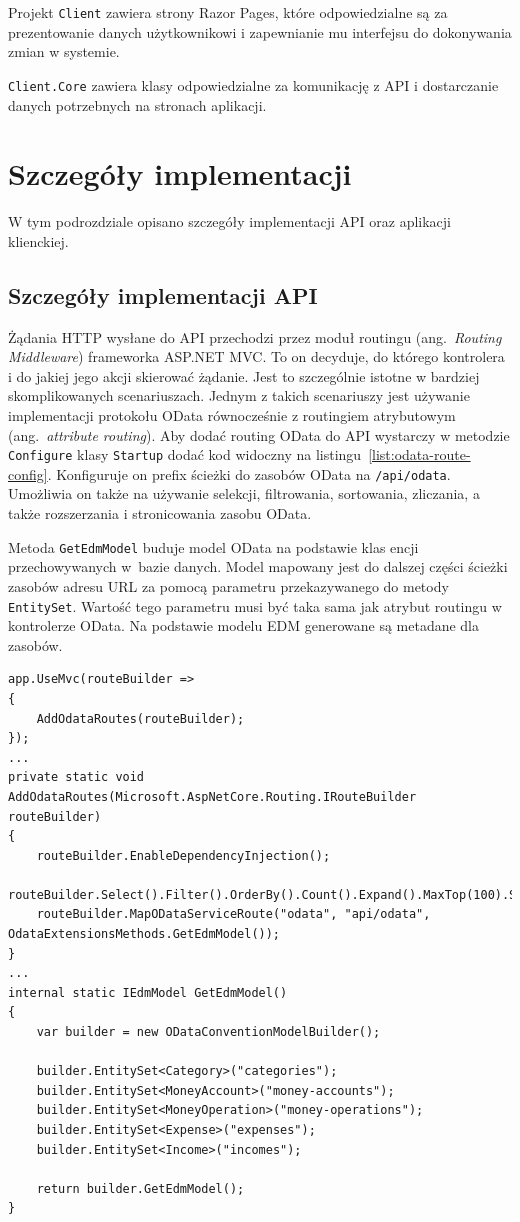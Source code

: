Projekt \texttt{Client} zawiera strony Razor Pages, które odpowiedzialne są za prezentowanie danych użytkownikowi i zapewnianie mu interfejsu do dokonywania zmian w systemie.

\texttt{Client.Core} zawiera klasy odpowiedzialne za komunikację z API i dostarczanie danych potrzebnych na stronach aplikacji.


\section{Szczegóły implementacji}
\label{sec:szczegoly-implementacji}
W tym podrozdziale opisano szczegóły implementacji API oraz aplikacji klienckiej. 

\subsection{Szczegóły implementacji API}
\label{subsec:szczegoly-implementacji-api}
Żądania HTTP wysłane do API przechodzi przez moduł routingu (ang.~\emph{Routing Middleware}) frameworka ASP.NET MVC. To on decyduje, do którego kontrolera i do jakiej jego akcji skierować żądanie. Jest to szczególnie istotne w bardziej skomplikowanych scenariuszach. Jednym z takich scenariuszy jest używanie implementacji protokołu OData równocześnie z routingiem atrybutowym (ang.~\emph{attribute routing}). Aby dodać routing OData do API wystarczy w metodzie \texttt{Configure} klasy \texttt{Startup} dodać kod widoczny na listingu~\ref{list:odata-route-config}. Konfiguruje on prefix ścieżki do zasobów OData na \texttt{/api/odata}. Umożliwia on także na używanie selekcji, filtrowania, sortowania, zliczania, a także rozszerzania i stronicowania zasobu OData. 

Metoda \texttt{GetEdmModel} buduje model OData na podstawie klas encji przechowywanych w~bazie danych. Model mapowany jest do dalszej części ścieżki zasobów adresu URL za pomocą parametru przekazywanego do metody \texttt{EntitySet}. Wartość tego parametru musi być taka sama jak atrybut routingu w kontrolerze OData. Na podstawie modelu EDM generowane są metadane dla zasobów. 

{\belowcaptionskip=-10pt
\begin{lstlisting}[label=list:odata-route-config,
    caption=Konfiguracja rouingu OData w aplikacji MVC]
app.UseMvc(routeBuilder =>
{
    AddOdataRoutes(routeBuilder);
});
...
private static void AddOdataRoutes(Microsoft.AspNetCore.Routing.IRouteBuilder routeBuilder)
{
    routeBuilder.EnableDependencyInjection();
    routeBuilder.Select().Filter().OrderBy().Count().Expand().MaxTop(100).SkipToken();
    routeBuilder.MapODataServiceRoute("odata", "api/odata", OdataExtensionsMethods.GetEdmModel());
}
...
internal static IEdmModel GetEdmModel()
{
    var builder = new ODataConventionModelBuilder();

    builder.EntitySet<Category>("categories");
    builder.EntitySet<MoneyAccount>("money-accounts");
    builder.EntitySet<MoneyOperation>("money-operations");
    builder.EntitySet<Expense>("expenses");
    builder.EntitySet<Income>("incomes");

    return builder.GetEdmModel();
}
\end{lstlisting}
}

